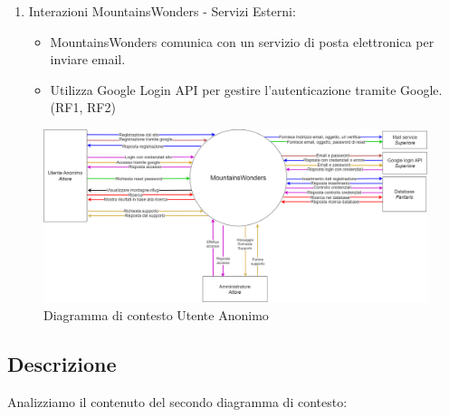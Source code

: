 \documentclass[a4paper,12pt]{article}
\begin{document}
\begin{enumerate}
    \item Interazioni MountainsWonders - Servizi Esterni:
    \begin{itemize}
        \item MountainsWonders comunica con un servizio di posta elettronica per inviare email.
        \item Utilizza Google Login API per gestire l'autenticazione tramite Google. (RF1, RF2)
    \end{itemize}
    
\end{enumerate}

\begin{figure}[H]
   \centering   \includegraphics[width=1.0\textwidth]{img-D2/contesto_anonimo.png}
    \caption{Diagramma di contesto Utente Anonimo}
\end{figure}



\subsection{Descrizione}
Analizziamo il contenuto del secondo diagramma di contesto:
\end{document}
